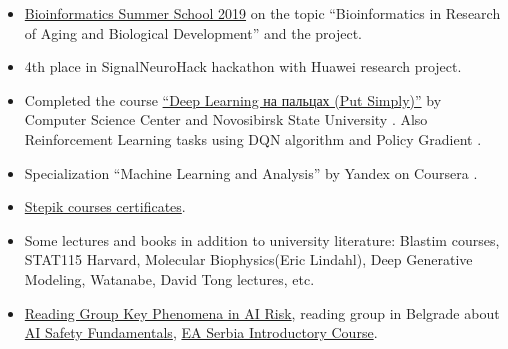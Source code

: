 \documentclass[11pt]{article}
\begin{document}
\begin{multicols}{2}

\begin{itemize}


\item \href{https://bioinf.me/education/summer/2019}{Bioinformatics Summer School 2019} on the topic “Bioinformatics in Research of Aging and Biological Development” and the project. \href{https://github.com/eluator/MCMC_bioinf_summer_school_2019}{}

\item 4th place in SignalNeuroHack hackathon with Huawei research project. \href{https://github.com/eluator/SignalNeuroHackTasks}{}

\item Completed the course \href{https://dlcourse.ai/}{“Deep Learning на пальцах (Put Simply)”} by Computer Science Center and Novosibirsk State University \href{https://github.com/eluator/dlcourse_ai}{}. Also Reinforcement Learning tasks using DQN algorithm and Policy Gradient \href{https://github.com/eluator/JetBrainsInternship}{}.

\item Specialization “Machine Learning and Analysis” by Yandex on Coursera \href{https://github.com/eluator/Coursera_ML}{}.

\item \href{https://stepik.org/users/19741243/certificates}{Stepik courses certificates}.

\item Some lectures and books in addition to university literature: Blastim courses, STAT115 Harvard, Molecular Biophysics(Eric Lindahl), Deep Generative Modeling, Watanabe, David Tong lectures, etc.

\item \href{https://www.alignmentforum.org/posts/vakhhNHduW9gmENTW/announcing-new-round-of-key-phenomena-in-ai-risk-reading}{Reading Group Key Phenomena in AI Risk}, reading group in Belgrade about \href{https://course.aisafetyfundamentals.com/alignment?_gl=1*1xg9r59*_ga*MTgyMzIzOTUwNS4xNjk4MzQwMDQy*_ga_LGQ75B1P00*MTcwNjcxMTA1OC4zLjEuMTcwNjcxMTA5MC4wLjAuMA..}{AI Safety Fundamentals}, \href{https://www.linkedin.com/posts/effective-altruism-serbia_easerbia-makedifference-effectivealtruism-activity-7046076217321566208-SMq2/}{EA Serbia Introductory Course}.


\vspace{0.5em}


\end{itemize}
\end{multicols}
\end{document}
